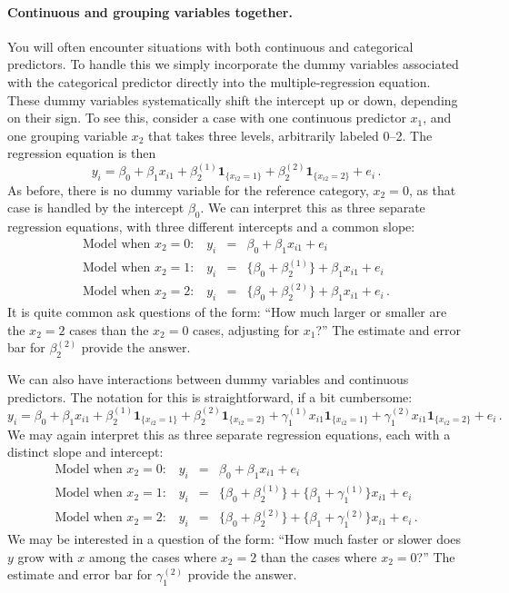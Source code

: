 \documentclass[11pt]{article}
\newcommand{\1}[1]{\mathbf{1}_{\{ {#1} \}}}
\begin{document}
\paragraph{Continuous and grouping variables together.}

You will often encounter situations with both continuous and categorical predictors.  To handle this we simply incorporate the dummy variables associated with the categorical predictor directly into the multiple-regression equation.  These dummy variables systematically shift the intercept up or down, depending on their sign.  To see this, consider a case with one continuous predictor $x_1$, and one grouping variable $x_2$ that takes three levels, arbitrarily labeled 0--2.  The regression equation is then
$$
y_i = \beta_0 + \beta_1 x_{i1} + \beta_2^{(1)} \1{x_{i2} = 1} + \beta_2^{(2)} \1{x_{i2} = 2} + e_i \, .
$$
As before, there is no dummy variable for the reference category, $x_2 = 0$, as that case is handled by the intercept $\beta_0$.  We can interpret this as three separate regression equations, with three different intercepts and a common slope:
\begin{eqnarray*}
\mbox{Model when $x_{2} = 0$:} \quad y_i &=& \beta_0 + \beta_1 x_{i1} + e_i \\
\mbox{Model when $x_{2} = 1$:} \quad y_i &=& \{\beta_0 + \beta_2^{(1)} \} + \beta_1 x_{i1} + e_i \\
\mbox{Model when $x_{2} = 2$:} \quad y_i &=&  \{\beta_0 + \beta_2^{(2)} \}  + \beta_1 x_{i1} + e_i \, .
\end{eqnarray*}
It is quite common ask questions of the form: ``How much larger or smaller are the $x_2 = 2$ cases than the $x_2 = 0$ cases, adjusting for $x_1$?'' The estimate and error bar for $\beta_2^{(2)}$ provide the answer.

We can also have interactions between dummy variables and continuous predictors.  The notation for this is straightforward, if a bit cumbersome:
$$
y_i = \beta_0 + \beta_1 x_{i1} + \beta_2^{(1)} \1{x_{i2} = 1} + \beta_2^{(2)} \1{x_{i2} = 2} + \gamma_1^{(1)} x_{i1} \1{x_{i2} = 1}  + \gamma_1^{(2)} x_{i1} \1{x_{i2} = 2}   + e_i \, .
$$
We may again interpret this as three separate regression equations, each with a distinct slope and intercept:
\begin{eqnarray*}
\mbox{Model when $x_{2} = 0$:} \quad y_i &=& \beta_0 + \beta_1 x_{i1} + e_i \\
\mbox{Model when $x_{2} = 1$:} \quad y_i &=& \{\beta_0 + \beta_2^{(1)} \} + \{\beta_1 + \gamma_1^{(1)} \} x_{i1} + e_i \\
\mbox{Model when $x_{2} = 2$:} \quad y_i &=&  \{\beta_0 + \beta_2^{(2)} \}  +  \{\beta_1 + \gamma_1^{(2)} \} x_{i1} + e_i \, .
\end{eqnarray*}
We may be interested in a question of the form: ``How much faster or slower does $y$ grow with $x$ among the cases where $x_2 = 2$ than the cases where $x_2 = 0$?'' The estimate and error bar for $\gamma_1^{(2)}$ provide the answer.
\end{document}
